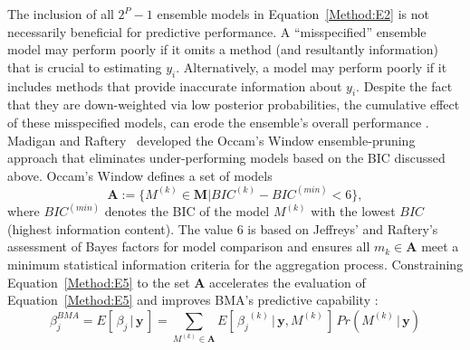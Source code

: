 \documentclass[journal=jpcbfk, manuscript=article]{achemso}
\newcommand{\+}[1]{\ensuremath{\mathbf{#1}}}
\newcommand{\rev}[1]{#1}
\begin{document}
The inclusion of all $2^P-1$ ensemble models in Equation~\ref{Method:E2} is not necessarily beneficial for predictive performance.
\rev{A ``misspecified'' ensemble model may perform poorly if it omits a method (and resultantly information) that is crucial to estimating $y_i$.
Alternatively, a model may perform poorly if it includes methods that provide inaccurate information about $y_i$.
Despite the fact that they are down-weighted via low posterior probabilities, the cumulative effect of these misspecified models, can erode the ensemble's overall performance \cite{Qian:2015, Martinez-Munoz:2009, Raftery:1998, Onorante:2014, Madigan:1994, Hoeting:1999, Morales-Casique:2010}.
Madigan and Raftery~\cite{Madigan:1994} developed the Occam's Window ensemble-pruning approach that eliminates under-performing models based on the BIC discussed above.}
Occam's Window defines a set of models
\begin{equation} \label{Method:E5}
	\textbf{A} := \{M^{(k)} \in \textbf{M} | BIC^{(k)} - BIC^{(min)} < 6\},
\end{equation}
where $BIC^{(min)}$ denotes the BIC of the model $M^{(k)}$ with the lowest $BIC$ \rev{(highest information content)}.
The value 6 is based on Jeffreys' \cite{Jefferys:1961} and Raftery's \cite{Raftery:1995} assessment of Bayes factors for model comparison and ensures all $m_k \in \mathbf{A}$ meet a minimum statistical information criteria for the aggregation process.
Constraining Equation~\ref{Method:E5} to the set $\+A$ accelerates the evaluation of Equation~\ref{Method:E5} and improves BMA's predictive capability \cite{Raftery:1998, Madigan:1994}:
\begin{equation} \label{Method:E6}
	\beta^{BMA}_j =  E[\,\beta_j \,|\, \+y\,] = \sum_{M^{(k)}\in \mathbf{A}} E[\,{\beta_j}^{(k)} \,|\, \+y,M^{(k)}\,] \,Pr(M^{(k)} \,|\, \textbf{y})
\end{equation}
\end{document}
